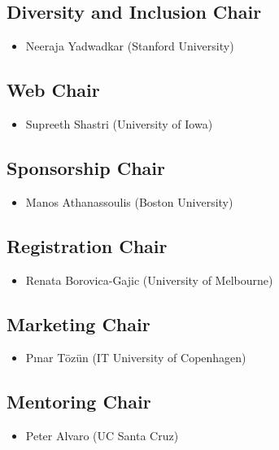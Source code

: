 \subsection*{Diversity and Inclusion Chair}
\begin{itemize}
    \item[] Neeraja Yadwadkar (Stanford University) 
\end{itemize}

\subsection*{Web Chair}
\begin{itemize}
    \item[] Supreeth Shastri (University of Iowa)
\end{itemize}

\subsection*{Sponsorship Chair}
\begin{itemize}
    \item[] Manos Athanassoulis (Boston University)
\end{itemize}

\subsection*{Registration Chair}
\begin{itemize}
    \item[] Renata Borovica-Gajic (University of Melbourne)
\end{itemize}

\subsection*{Marketing Chair}
\begin{itemize}
    \item[] Pınar Tözün (IT University of Copenhagen)
\end{itemize}

\subsection*{Mentoring Chair}
\begin{itemize}
    \item[] Peter Alvaro (UC Santa Cruz)
\end{itemize}

